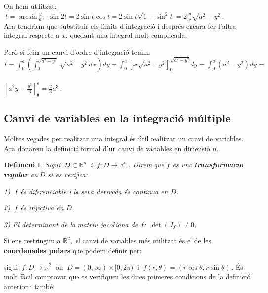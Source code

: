 \documentclass[12pt]{article}
\newtheorem{definicio}{Definici{\'o}}[subsection]
\newcommand{\R}{\mathbb{R}}
\begin{document}
On hem utilitzat: $\ t=\arcsin \frac{y}{a}; \ \ \sin 2t=2\sin t \cos
t=2 \sin t \sqrt{1-\sin^2 t}=2 \frac{y}{a^2}\sqrt{a^2-y^2}\,.$\\

Ara tendr{\'\i}em que substituir els l{\'\i}mits d'integraci{\'o} i despr{\'e}s encara
fer l'altra integral respecte a $x$, quedant una integral molt
complicada.

Per{\`o} si feim un canvi d'ordre
d'integraci{\'o} tenim:\\

\hspace*{1cm}$\displaystyle
I=\int_0^a\left(\int_0^{\sqrt{a^2-y^2}}\sqrt{a^2-y^2}\,dx\right)dy=
\int_0^a\left[x\sqrt{a^2-y^2}\right]_0^{\sqrt{a^2-y^2}}dy=
\int_0^a(a^2-y^2)dy=$\\\\

\hspace*{1cm}$\displaystyle\left[a^2y-\frac{y^3}{3}\right]_0^a=\frac{2}{3}a^3\,.$

\vspace*{1cm}
\subsection{Canvi de variables en la integraci{\'o} m{\'u}ltiple}

Moltes vegades per realitzar una integral {\'e}s {\'u}til realitzar un canvi
de variables. Ara donarem la definici{\'o} formal d'un canvi de
variables en dimensi{\'o} $n$.

\begin{definicio}
Sigui $\ D\subset\R^n\,$ i $\ f:D\to \R^n\,.$ Direm que $f$ {\'e}s una
\textbf{transformaci{\'o} regular} en $D$ si es verifica:

\hspace*{2cm} 1) $\ f$ {\'e}s diferenciable i la seva derivada {\'e}s
continua en $D$.

\hspace*{2cm} 2) $\ f$ {\'e}s injectiva en $D$.

\hspace*{2cm} 3) El determinant de la matriu jacobiana de $f$: $\
\det(J_f)\not=0$.
\end{definicio}

Si ens restringim a $\R^2,$ el canvi de variables m{\'e}s utilitzat {\'e}s
el de les \textbf{coordenades polars} que podem definir per:

sigui $\ f:D\to \R^2\ $ on $\ D=(0,\infty)\times[0,2\pi)\ $ i $\
f(r,\theta)=(r\cos \theta,r\sin \theta)\,. $ {\'E}s molt f{\`a}cil comprovar
que es verifiquen les dues primeres condicions de la definici{\'o}
anterior i tamb{\'e}:
\end{document}
